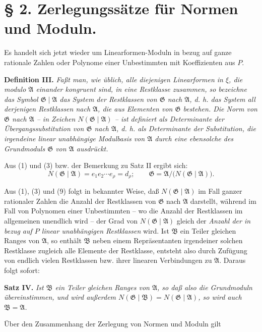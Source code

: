 \documentclass[11pt]{article}
\newcommand{\Amod}{\mathfrak A}
\newcommand{\Bmod}{\mathfrak B}
\newcommand{\Gmod}{\mathfrak G}
\newcommand{\Norm}{N}
\begin{document}
\section*{§ 2. Zerlegungssätze für Normen und Moduln.}

Es handelt sich jetzt wieder um Linearformen-Moduln in bezug auf ganze rationale Zahlen oder Polynome einer Unbestimmten mit Koeffizienten aus $P$.

\medskip
\noindent\textbf{Definition III.} \emph{Faßt man, wie üblich, alle diejenigen Linearformen in $\xi$, die modulo $\Amod$ einander kongruent sind, in eine Restklasse zusammen, so bezeichne das Symbol $\Gmod\mid\Amod$ das System der Restklassen von $\Gmod$ nach $\Amod$, d. h. das System all derjenigen Restklassen nach $\Amod$, die aus Elementen von $\Gmod$ bestehen. Die Norm von $\Gmod$ nach $\Amod$ -- in Zeichen $\Norm(\Gmod\mid\Amod)$ -- ist definiert als Determinante der Übergangssubstitution von $\Gmod$ nach $\Amod$, d. h. als Determinante der Substitution, die irgendeine linear unabhängige Modulbasis von $\Amod$ durch eine ebensolche des Grundmoduls $\Gmod$ von $\Amod$ ausdrückt.}

Aus (1) und (3) bzw. der Bemerkung zu Satz II ergibt sich:
\begin{equation}
 \Norm(\Gmod\mid\Amod)=e_1e_2\cdots e_\rho=d_\rho;
 \qquad
 \Gmod=\Amod/\bigl(\Norm(\Gmod\mid\Amod)\bigr).
\tag{9}
\end{equation}

Aus (1), (3) und (9) folgt in bekannter Weise, daß $\Norm(\Gmod\mid\Amod)$ im Fall ganzer rationaler Zahlen die Anzahl der Restklassen von $\Gmod$ nach $\Amod$ darstellt, während im Fall von Polynomen einer Unbestimmten -- wo die Anzahl der Restklassen im allgemeinen unendlich wird -- der Grad von $\Norm(\Gmod\mid\Amod)$ gleich der \emph{Anzahl der in bezug auf $P$ linear unabhängigen Restklassen} wird. Ist $\Bmod$ ein Teiler gleichen Ranges von $\Amod$, so enthält $\Bmod$ neben einem Repräsentanten irgendeiner solchen Restklasse zugleich alle Elemente der Restklasse, entsteht also durch Zufügung von endlich vielen Restklassen bzw. ihrer linearen Verbindungen zu $\Amod$. Daraus folgt sofort:

\medskip
\noindent\textbf{Satz IV.} \emph{Ist $\Bmod$ ein Teiler gleichen Ranges von $\Amod$, so daß also die Grundmoduln übereinstimmen, und wird außerdem $\Norm(\Gmod\mid\Bmod)=\Norm(\Gmod\mid\Amod)$, so wird auch $\Bmod=\Amod$.}

Über den Zusammenhang der Zerlegung von Normen und Moduln gilt
\end{document}
